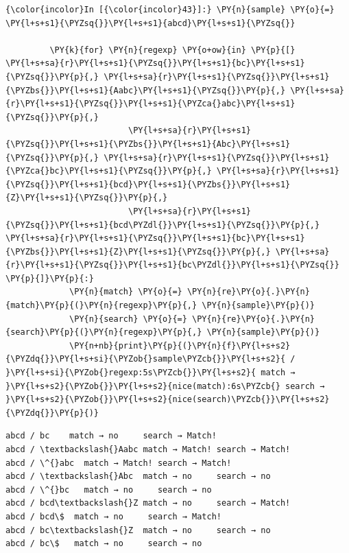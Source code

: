     \begin{Verbatim}[commandchars=\\\{\}]
{\color{incolor}In [{\color{incolor}43}]:} \PY{n}{sample} \PY{o}{=} \PY{l+s+s1}{\PYZsq{}}\PY{l+s+s1}{abcd}\PY{l+s+s1}{\PYZsq{}}
         
         \PY{k}{for} \PY{n}{regexp} \PY{o+ow}{in} \PY{p}{[} \PY{l+s+sa}{r}\PY{l+s+s1}{\PYZsq{}}\PY{l+s+s1}{bc}\PY{l+s+s1}{\PYZsq{}}\PY{p}{,} \PY{l+s+sa}{r}\PY{l+s+s1}{\PYZsq{}}\PY{l+s+s1}{\PYZbs{}}\PY{l+s+s1}{Aabc}\PY{l+s+s1}{\PYZsq{}}\PY{p}{,} \PY{l+s+sa}{r}\PY{l+s+s1}{\PYZsq{}}\PY{l+s+s1}{\PYZca{}abc}\PY{l+s+s1}{\PYZsq{}}\PY{p}{,} 
                         \PY{l+s+sa}{r}\PY{l+s+s1}{\PYZsq{}}\PY{l+s+s1}{\PYZbs{}}\PY{l+s+s1}{Abc}\PY{l+s+s1}{\PYZsq{}}\PY{p}{,} \PY{l+s+sa}{r}\PY{l+s+s1}{\PYZsq{}}\PY{l+s+s1}{\PYZca{}bc}\PY{l+s+s1}{\PYZsq{}}\PY{p}{,} \PY{l+s+sa}{r}\PY{l+s+s1}{\PYZsq{}}\PY{l+s+s1}{bcd}\PY{l+s+s1}{\PYZbs{}}\PY{l+s+s1}{Z}\PY{l+s+s1}{\PYZsq{}}\PY{p}{,} 
                         \PY{l+s+sa}{r}\PY{l+s+s1}{\PYZsq{}}\PY{l+s+s1}{bcd\PYZdl{}}\PY{l+s+s1}{\PYZsq{}}\PY{p}{,} \PY{l+s+sa}{r}\PY{l+s+s1}{\PYZsq{}}\PY{l+s+s1}{bc}\PY{l+s+s1}{\PYZbs{}}\PY{l+s+s1}{Z}\PY{l+s+s1}{\PYZsq{}}\PY{p}{,} \PY{l+s+sa}{r}\PY{l+s+s1}{\PYZsq{}}\PY{l+s+s1}{bc\PYZdl{}}\PY{l+s+s1}{\PYZsq{}} \PY{p}{]}\PY{p}{:}
             \PY{n}{match} \PY{o}{=} \PY{n}{re}\PY{o}{.}\PY{n}{match}\PY{p}{(}\PY{n}{regexp}\PY{p}{,} \PY{n}{sample}\PY{p}{)}
             \PY{n}{search} \PY{o}{=} \PY{n}{re}\PY{o}{.}\PY{n}{search}\PY{p}{(}\PY{n}{regexp}\PY{p}{,} \PY{n}{sample}\PY{p}{)}
             \PY{n+nb}{print}\PY{p}{(}\PY{n}{f}\PY{l+s+s2}{\PYZdq{}}\PY{l+s+si}{\PYZob{}sample\PYZcb{}}\PY{l+s+s2}{ / }\PY{l+s+si}{\PYZob{}regexp:5s\PYZcb{}}\PY{l+s+s2}{ match → }\PY{l+s+s2}{\PYZob{}}\PY{l+s+s2}{nice(match):6s\PYZcb{} search → }\PY{l+s+s2}{\PYZob{}}\PY{l+s+s2}{nice(search)\PYZcb{}}\PY{l+s+s2}{\PYZdq{}}\PY{p}{)}
\end{Verbatim}


    \begin{Verbatim}[commandchars=\\\{\}]
abcd / bc    match → no     search → Match!
abcd / \textbackslash{}Aabc match → Match! search → Match!
abcd / \^{}abc  match → Match! search → Match!
abcd / \textbackslash{}Abc  match → no     search → no
abcd / \^{}bc   match → no     search → no
abcd / bcd\textbackslash{}Z match → no     search → Match!
abcd / bcd\$  match → no     search → Match!
abcd / bc\textbackslash{}Z  match → no     search → no
abcd / bc\$   match → no     search → no

    \end{Verbatim}


